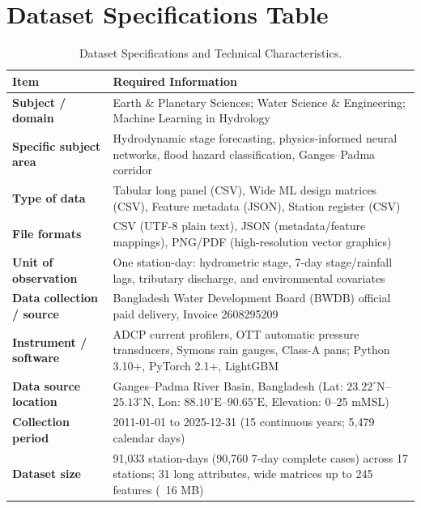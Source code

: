 \documentclass[11pt,a4paper]{article}
\begin{document}
\section{Dataset Specifications Table}

\begin{table}[htbp]\centering\small
\caption{Dataset Specifications and Technical Characteristics.}
\label{tab:specs}
\begin{tabularx}{\linewidth}{|>{\bfseries}p{4.3cm}|X|}
\hline
\rowcolor{wordheadbg} \textbf{Item} & \textbf{Required Information} \\ \hline
\cellcolor{wordkeybg}Subject / domain & Earth \& Planetary Sciences; Water Science \& Engineering; Machine Learning in Hydrology \\ \hline
\cellcolor{wordkeybg}Specific subject area & Hydrodynamic stage forecasting, physics-informed neural networks, flood hazard classification, Ganges--Padma corridor \\ \hline
\cellcolor{wordkeybg}Type of data & Tabular long panel (CSV), Wide ML design matrices (CSV), Feature metadata (JSON), Station register (CSV) \\ \hline
\cellcolor{wordkeybg}File formats & CSV (UTF-8 plain text), JSON (metadata/feature mappings), PNG/PDF (high-resolution vector graphics) \\ \hline
\cellcolor{wordkeybg}Unit of observation & One station-day: hydrometric stage, 7-day stage/rainfall lags, tributary discharge, and environmental covariates \\ \hline
\cellcolor{wordkeybg}Data collection / source & Bangladesh Water Development Board (BWDB) official paid delivery, Invoice 2608295209 \\ \hline
\cellcolor{wordkeybg}Instrument / software & ADCP current profilers, OTT automatic pressure transducers, Symons rain gauges, Class-A pans; Python 3.10+, PyTorch 2.1+, LightGBM \\ \hline
\cellcolor{wordkeybg}Data source location & Ganges--Padma River Basin, Bangladesh (Lat: $23.22^\circ\text{N}$--$25.13^\circ\text{N}$, Lon: $88.10^\circ\text{E}$--$90.65^\circ\text{E}$, Elevation: 0--25 mMSL) \\ \hline
\cellcolor{wordkeybg}Collection period & 2011-01-01 to 2025-12-31 (15 continuous years; 5,479 calendar days) \\ \hline
\cellcolor{wordkeybg}Dataset size & 91,033 station-days (90,760 7-day complete cases) across 17 stations; 31 long attributes, wide matrices up to 245 features (~16 MB) \\ \hline

\end{tabularx}
\end{table}
\end{document}

